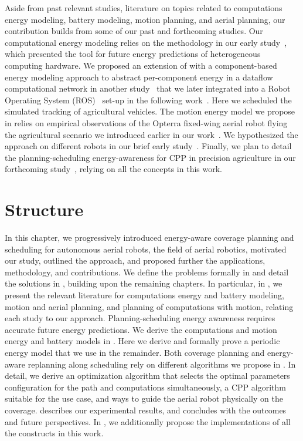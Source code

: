 Aside from past relevant studies, literature on topics related to computations energy modeling, battery modeling, motion planning, and aerial planning, our contribution builds from some of our past and forthcoming studies. Our computational energy modeling relies on the methodology in our early study~\citep{seewald2019coarse}, which presented the \powprof{} tool for future energy predictions of heterogeneous computing hardware. We proposed an extension of \powprof{} with a component-based energy modeling approach to abstract per-component energy in a dataflow computational network in another study~\citep{seewald2019component} that we later integrated into a Robot Operating System (ROS)~\citep{quigley2009ros} set-up in the following work~\citep{zamanakos2020energy}. Here we scheduled the simulated tracking of agricultural vehicles. The motion energy model we propose in  relies on empirical observations of the Opterra fixed-wing aerial robot flying the agricultural scenario we introduced earlier in our work~\citep{seewald2020mechanical}. We hypothesized the approach on different robots in our brief early study~\citep{seewald2020beyond}. Finally, we plan to detail the planning-scheduling energy-awareness for CPP in precision agriculture in our forthcoming study~\citep{seewald202Xenergy}, relying on all the concepts in this work. 

\section{Structure}
\label{sec:structure}

In this chapter, we progressively introduced energy-aware coverage planning and scheduling for autonomous aerial robots, the field of aerial robotics, motivated our study, outlined the approach, and proposed further the applications, methodology, and contributions. We define the problems formally in  and detail the solutions in , building upon the remaining chapters. In particular, in , we present the relevant literature for computations energy and battery modeling, motion and aerial planning, and planning of computations with motion, relating each study to our approach. Planning-scheduling energy awareness requires accurate future energy predictions. We derive the computations and motion energy and battery models in . Here we derive and formally prove a periodic energy model that we use in the remainder. Both coverage planning and energy-aware replanning along scheduling rely on different algorithms we propose in . In detail, we derive an optimization algorithm that selects the optimal parameters configuration for the path and computations simultaneously, a CPP algorithm suitable for the use case, and ways to guide the aerial robot physically on the coverage.  describes our experimental results, and  concludes with the outcomes and future perspectives. In , we additionally propose the implementations of all the constructs in this work.



